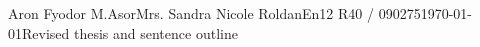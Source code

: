 \documentclass[12pt,letterpaper]{article}
\begin{document}
\begin{mla}{Aron Fyodor M.}{Asor}{Mrs. Sandra Nicole Roldan}{En12 R40 / 090275}{\today}{Revised thesis and sentence outline}

	

\end{mla}
\end{document}
